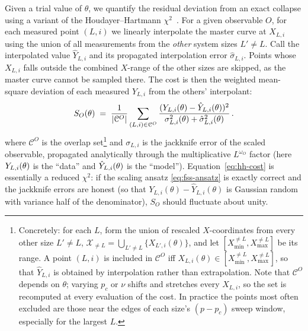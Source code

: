 \documentclass[pra,aps,twocolumn,groupedaddress,superscriptaddress,nofootinbib,preprintnumbers]{revtex4-2}
\begin{document}
\begin{widetext}
		Given a trial value of $\theta$, we quantify the
		residual deviation from an exact collapse using a variant of the
		Houdayer--Hartmann $\chi^2$~\cite{houdayer2004low}. For a given
		observable $O$, for each measured point $(L, i)$ we linearly
		interpolate the master curve at $X_{L,i}$ using the union of all
		measurements from the \emph{other} system sizes $L' \neq L$. Call the
		interpolated value $\hat Y_{L,i}$ and its propagated interpolation
		error $\hat\sigma_{L,i}$. Points whose $X_{L,i}$ falls outside the
		combined $X$-range of the other sizes are skipped, as the master curve
		cannot be sampled there. The cost is then the weighted mean-square
		deviation of each measured $Y_{L,i}$ from the others' interpolant:
		\begin{equation}
			S_O(\theta) \;=\;
			\frac{1}{|\mathcal{C}^O|}
			\sum_{(L,i) \in \mathcal{C}^O}
			\frac{(Y_{L,i}(\theta) - \hat Y_{L,i}(\theta))^2}
			{\sigma_{L,i}^2(\theta) + \hat\sigma_{L,i}^2(\theta)}\,.
			\label{eq:hh-cost}
		\end{equation}
		where $\mathcal{C}^O$ is the overlap set\footnote{Concretely: for each $L$, form the union of rescaled $X$-coordinates from every other size $L' \neq L$, $\mathcal{X}_{\neq L} = \bigcup_{L' \neq L}\{X_{L',i}(\theta)\}$, and let $[X_{\min}^{\neq L}, X_{\max}^{\neq L}]$ be its range. A point $(L,i)$ is included in $\mathcal{C}^O$ iff $X_{L,i}(\theta) \in [X_{\min}^{\neq L}, X_{\max}^{\neq L}]$, so that $\hat Y_{L,i}$ is obtained by interpolation rather than extrapolation. Note that $\mathcal{C}^O$ depends on $\theta$; varying $p_c$ or $\nu$ shifts and stretches every $X_{L,i}$, so the set is recomputed at every evaluation of the cost. In practice the points most often excluded are those near the edges of each size's $(p-p_c)$ sweep window, especially for the largest $L$.} and $\sigma_{L,i}$ is the jackknife error of
		the scaled observable, propagated analytically through the multiplicative
		$L^{\omega_O}$ factor (here $Y_{L,i}(\theta)$ is the ``data'' and $\hat Y_{L,i}(\theta)$ is the ``model''). Equation~\eqref{eq:hh-cost} is essentially a
		reduced $\chi^2$: if the scaling ansatz \eqref{eq:fss-ansatz} is
		exactly correct and the jackknife errors are honest (so that $Y_{L,i}(\theta) - \hat Y_{L,i}(\theta)$ is Gaussian random with variance half of the denominator), $S_O$ should
		fluctuate about unity.
		
		\label{sec:joint-fit}
		

\end{widetext}
\end{document}
